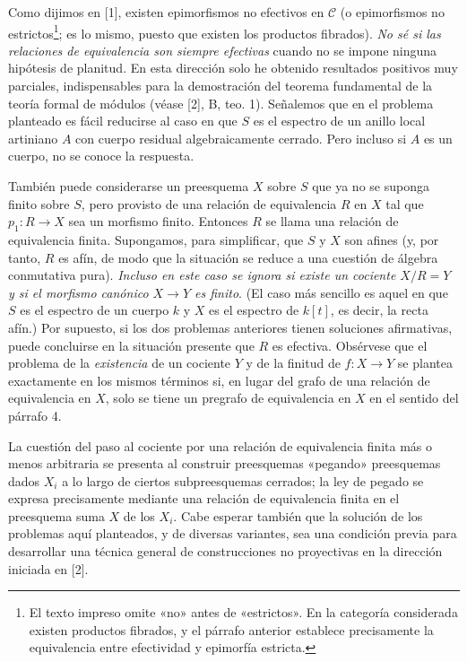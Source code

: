 Como dijimos en [1], existen epimorfismos no efectivos en $\mathcal C$ (o
epimorfismos no estrictos\footnote{El texto impreso omite «no» antes de
«estrictos». En la categoría considerada existen productos fibrados, y el
párrafo anterior establece precisamente la equivalencia entre efectividad y
epimorfía estricta.}; es lo mismo, puesto que existen los productos fibrados).
\emph{No sé si las relaciones de equivalencia son siempre efectivas} cuando
no se impone ninguna hipótesis de planitud. En esta dirección solo he obtenido
resultados positivos muy parciales, indispensables para la demostración del
teorema fundamental de la teoría formal de módulos (véase [2], B, teo. 1).
Señalemos que en el problema planteado es fácil reducirse al caso en que $S$
es el espectro de un anillo local artiniano $A$ con cuerpo residual
algebraicamente cerrado. Pero incluso si $A$ es un cuerpo, no se conoce la
respuesta.

También puede considerarse un preesquema $X$ sobre $S$ que ya no se suponga
finito sobre $S$, pero provisto de una relación de equivalencia $R$ en $X$ tal
que $p_1:R\longrightarrow X$ sea un morfismo finito. Entonces $R$ se llama
una relación de equivalencia finita. Supongamos, para simplificar, que $S$ y
$X$ son afines (y, por tanto, $R$ es afín, de modo que la situación se reduce
a una cuestión de álgebra conmutativa pura). \emph{Incluso en este caso se
ignora si existe un cociente $X/R=Y$ y si el morfismo canónico
$X\longrightarrow Y$ es finito}. (El caso más sencillo es aquel en que $S$ es
el espectro de un cuerpo $k$ y $X$ es el espectro de $k[t]$, es decir, la
recta afín.) Por supuesto, si los dos problemas anteriores tienen soluciones
afirmativas, puede concluirse en la situación presente que $R$ es efectiva.
Obsérvese que el problema de la \emph{existencia} de un cociente $Y$ y de la
finitud de $f:X\longrightarrow Y$ se plantea exactamente en los mismos
términos si, en lugar del grafo de una relación de equivalencia en $X$, solo
se tiene un pregrafo de equivalencia en $X$ en el sentido del párrafo 4.

La cuestión del paso al cociente por una relación de equivalencia finita más
o menos arbitraria se presenta al construir preesquemas «pegando» preesquemas
dados $X_i$ a lo largo de ciertos subpreesquemas cerrados; la ley de pegado se
expresa precisamente mediante una relación de equivalencia finita en el
preesquema suma $X$ de los $X_i$. Cabe esperar también que la solución de los
problemas aquí planteados, y de diversas variantes, sea una condición previa
para desarrollar una técnica general de construcciones no proyectivas en la
dirección iniciada en [2].

